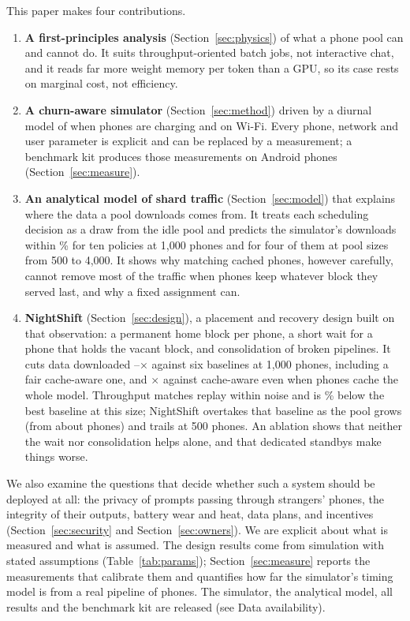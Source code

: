 \documentclass[preprint,review,12pt,authoryear]{elsarticle}
\begin{document}
This paper makes four contributions.
\begin{enumerate}
\item \textbf{A first-principles analysis} (Section~\ref{sec:physics}) of what
a phone pool can and cannot do. It suits throughput-oriented batch jobs, not
interactive chat, and it reads far more weight memory per token than a GPU, so
its case rests on marginal cost, not efficiency.
\item \textbf{A churn-aware simulator} (Section~\ref{sec:method}) driven by a
diurnal model of when phones are charging and on Wi-Fi. Every phone, network
and user parameter is explicit and can be replaced by a measurement; a
benchmark kit produces those measurements on Android phones
(Section~\ref{sec:measure}).
\item \textbf{An analytical model of shard traffic}
(Section~\ref{sec:model}) that explains where the data a pool downloads comes
from. It treats each scheduling decision as a draw from the idle pool and
predicts the simulator's downloads within \TMErrAbsMaxPct\% for ten policies
at 1,000 phones and for four of them at pool sizes from 500 to 4,000. It shows why matching cached phones, however carefully, cannot remove
most of the traffic when phones keep whatever block they served last, and why a
fixed assignment can.
\item \textbf{NightShift} (Section~\ref{sec:design}), a placement and recovery
design built on that observation: a permanent home block per phone, a short
wait for a phone that holds the vacant block, and consolidation of broken
pipelines. It cuts data downloaded \GBRatioBaseMin--\GBRatioBaseMax$\times$
against six baselines at 1,000 phones, including a fair cache-aware one, and
\CacheFullRatioCA$\times$ against cache-aware even when phones cache the whole
model. Throughput matches replay within noise and is \NSbehindConsolPct\%
below the best baseline at this size; NightShift overtakes that baseline as
the pool grows (from about \PoolCross{} phones) and trails at 500 phones. An
ablation shows that neither the wait nor consolidation helps alone, and that
dedicated standbys make things worse.
\end{enumerate}

We also examine the questions that decide whether such a system should be
deployed at all: the privacy of prompts passing through strangers' phones, the
integrity of their outputs, battery wear and heat, data plans, and incentives
(Section~\ref{sec:security} and Section~\ref{sec:owners}). We are explicit
about what is measured and what is assumed. The design results come from
simulation with stated assumptions (Table~\ref{tab:params});
Section~\ref{sec:measure} reports the measurements that calibrate them and
quantifies how far the simulator's timing model is from a real pipeline of
phones. The simulator, the analytical model, all results and the benchmark kit
are released (see Data availability).
\end{document}
